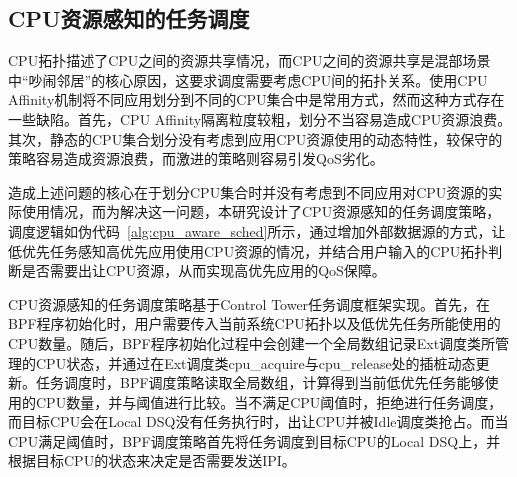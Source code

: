 

\subsection{CPU资源感知的任务调度} 


CPU拓扑描述了CPU之间的资源共享情况，而CPU之间的资源共享是混部场景中“吵闹邻居”的核心原因，这要求调度需要考虑CPU间的拓扑关系。使用CPU Affinity机制将不同应用划分到不同的CPU集合中是常用方式，然而这种方式存在一些缺陷。首先，CPU Affinity隔离粒度较粗，划分不当容易造成CPU资源浪费。其次，静态的CPU集合划分没有考虑到应用CPU资源使用的动态特性，较保守的策略容易造成资源浪费，而激进的策略则容易引发QoS劣化。

造成上述问题的核心在于划分CPU集合时并没有考虑到不同应用对CPU资源的实际使用情况，而为解决这一问题，本研究设计了CPU资源感知的任务调度策略，调度逻辑如伪代码~\ref{alg:cpu_aware_sched}所示，通过增加外部数据源的方式，让低优先任务感知高优先应用使用CPU资源的情况，并结合用户输入的CPU拓扑判断是否需要出让CPU资源，从而实现高优先应用的QoS保障。

CPU资源感知的任务调度策略基于Control Tower任务调度框架实现。首先，在BPF程序初始化时，用户需要传入当前系统CPU拓扑以及低优先任务所能使用的CPU数量。随后，BPF程序初始化过程中会创建一个全局数组记录Ext调度类所管理的CPU状态，并通过在Ext调度类cpu\_acquire与cpu\_release处的插桩动态更新。任务调度时，BPF调度策略读取全局数组，计算得到当前低优先任务能够使用的CPU数量，并与阈值进行比较。当不满足CPU阈值时，拒绝进行任务调度，而目标CPU会在Local DSQ没有任务执行时，出让CPU并被Idle调度类抢占。而当CPU满足阈值时，BPF调度策略首先将任务调度到目标CPU的Local DSQ上，并根据目标CPU的状态来决定是否需要发送IPI。

